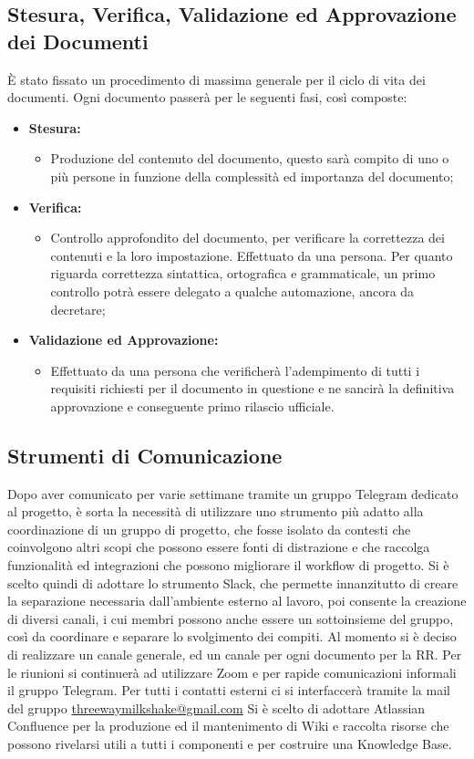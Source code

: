 \subsection{Stesura, Verifica, Validazione ed Approvazione dei Documenti}
È stato fissato un procedimento di massima generale per il ciclo di vita dei documenti. Ogni documento passerà per le seguenti fasi, così composte:
\begin{itemize}
    \item \textbf{Stesura:}
    \begin{itemize}
        \item Produzione del contenuto del documento, questo sarà compito di uno o più persone in funzione della complessità ed importanza del documento;
    \end{itemize}
    \item \textbf{Verifica:}
    \begin{itemize}
        \item Controllo approfondito del documento, per verificare la correttezza dei contenuti e la loro impostazione. Effettuato da una persona. Per quanto riguarda correttezza sintattica, ortografica e grammaticale, un primo controllo potrà essere delegato a qualche automazione, ancora da decretare;
    \end{itemize}
    \item \textbf{Validazione ed Approvazione:}
    \begin{itemize}
        \item Effettuato da una persona che verificherà l'adempimento di tutti i requisiti richiesti per il documento in questione e ne sancirà la definitiva approvazione e conseguente primo rilascio ufficiale.
    \end{itemize}
\end{itemize}

\subsection{Strumenti di Comunicazione}
Dopo aver comunicato per varie settimane tramite un gruppo Telegram dedicato al progetto, è sorta la necessità di utilizzare uno strumento più adatto alla coordinazione di un gruppo di progetto, che fosse isolato da contesti che coinvolgono altri scopi che possono essere fonti di distrazione e che raccolga funzionalità ed integrazioni che possono migliorare il workflow di progetto. Si è scelto quindi di adottare lo strumento Slack, che permette innanzitutto di creare la separazione necessaria dall'ambiente esterno al lavoro, poi consente la creazione di diversi canali, i cui membri possono anche essere un sottoinsieme del gruppo, così da coordinare e separare lo svolgimento dei compiti. Al momento si è deciso di realizzare un canale generale, ed un canale per ogni documento per la RR. Per le riunioni si continuerà ad utilizzare Zoom e per rapide comunicazioni informali il gruppo Telegram. Per tutti i contatti esterni ci si interfaccerà tramite la mail del gruppo \href{mailto:threewaymilkshake@gmail.com}{threewaymilkshake@gmail.com}
Si è scelto di adottare Atlassian Confluence per la produzione ed il mantenimento di Wiki e raccolta risorse che possono rivelarsi utili a tutti i componenti e per costruire una Knowledge Base.

